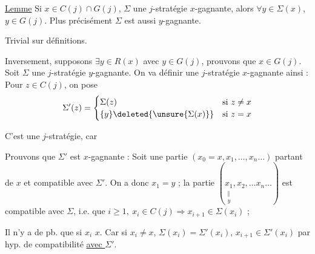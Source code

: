 \uline{Lemme} \quad Si $x\in C(j)\cap G(j)$, $\Sigma$ une $j$-stratégie $x$-gagnante, alors $\forall y\in\Sigma(x)$,  $y\in G(j)$.  Plus précisément $\Sigma$ est aussi $y$-gagnante.


Trivial sur définitions.

Inversement, supposons $\exists y\in R(x)$ avec $y\in G(j)$, prouvons que $x\in G(j)$. Soit $\Sigma$ une $j$-stratégie $y$-gagnante. On va  définir une $j$-stratégie $x$-gagnante  ainsi : Pour $z\in C(j)$, on pose
\[
\Sigma'(z)=\begin{cases}
\Sigma(z)&\text{si }z\ne x\\
\{y\}\deleted{\unsure{\Sigma(x)}}&\text{si }z=x
\end{cases}
\]

C'est une $j$-stratégie, car 

Prouvons que $\Sigma'$ est $x$-gagnante : Soit une partie $(x_0=x,x_1,\ldots,x_n\ldots)$ partant de $x$ et compatible avec $\Sigma'$. On a donc $x_1=y$ ;   la partie $(\underset{\substack{\Vert\\y}}{x_1},x_2,\ldots x_n\ldots)$ est compatible avec $\Sigma$, i.e. que  $i\geq1,\ x_i\in C(j)\Longrightarrow x_{i+1}\in\Sigma(x_i)$ ;

Il n'y a de pb. que si \deleted{\unsure{$\Sigma$}}  $x_i$  \deleted{$=$} $x$. Car si $x_i\ne x$, $\Sigma(x_i)=\Sigma'(x_i)$,  $x_{i+1}\in\Sigma'(x_i)$ par hyp. de compatibilité \uline{avec $\Sigma'$}.



